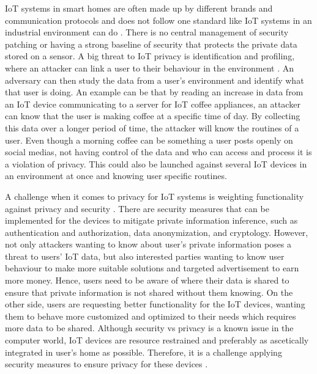 \gls{IoT} systems in smart homes are often made up by different brands and communication protocols and does not follow one standard like \gls{IoT} systems in an industrial environment can do \cite{IoTPrivSecSmarthome}. There is no central management of security patching or having a strong baseline of security that protects the private data stored on a sensor. A big threat to \gls{IoT} privacy is identification and profiling, where an attacker can link a user to their behaviour in the environment \cite{IoTSecPrivSafeEth}. An adversary can then study the data from a user's environment and identify what that user is doing. An example can be that by reading an increase in data from an \gls{IoT} device communicating to a server for \gls{IoT} coffee appliances, an attacker can know that the user is making coffee at a specific time of day. By collecting this data over a longer period of time, the attacker will know the routines of a user. Even though a morning coffee can be something a user posts openly on social medias, not having control of the data and who can access and process it is a violation of privacy. This could also be launched against several \gls{IoT} devices in an environment at once and knowing user specific routines. 

A challenge when it comes to privacy for \gls{IoT} systems is weighting functionality against privacy and security \cite{PrivacyIoTSurvey}. There are security measures that can be implemented for the devices to mitigate private information inference, such as authentication and authorization, data anonymization, and cryptology. However, not only attackers wanting to know about user's private information poses a threat to users' \gls{IoT} data, but also interested parties wanting to know user behaviour to make more suitable solutions and targeted advertisement to earn more money. Hence, users need to be aware of where their data is shared to ensure that private information is not shared without them knowing. On the other side, users are requesting better functionality for the \gls{IoT} devices, wanting them to behave more customized and optimized to their needs which requires more data to be shared. Although security vs privacy is a known issue in the computer world, \gls{IoT} devices are resource restrained and preferably as ascetically integrated in user's home as possible. Therefore, it is a challenge applying security measures to ensure privacy for these devices \cite{PrivacyIoTSurvey}. 

